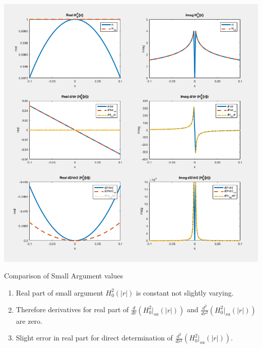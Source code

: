 \documentclass{article}
\newcommand{\0}{\varnothing}
\begin{document}
\begin{minipage}{0.7\textwidth}
\includegraphics[width=1\columnwidth]{figures/OneDGreensFct}
\end{minipage}
\begin{minipage}{0.3\textwidth}
	{\centering Comparison of Small Argument values\ \\}
	\begin{enumerate}
		\item Real part of small argument $H_0^2(|r|)$ is constant not slightly varying. 
		\item Therefore derivatives for real part of $\frac{d}{dr}\left(H_0^2|_{sa} (|r|)\right)$ and $\frac{d^2}{dr^2}\left(H_0^2|_{sa} (|r|)\right)$ are zero.
		\item Slight error in real part for direct determination of $\frac{d^2}{dr^2}\left(H_0^2|_{sa} (|r|)\right)$.
	\end{enumerate}
\end{minipage}
\end{document}
